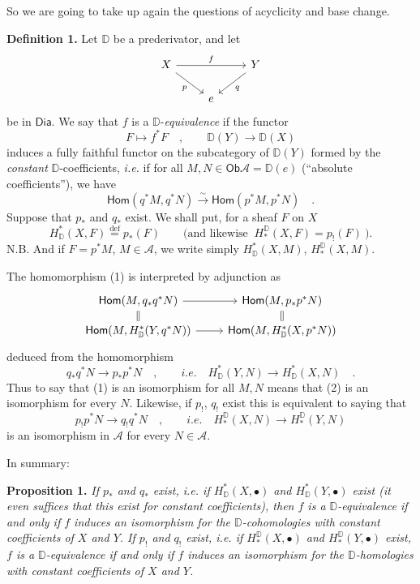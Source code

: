 \documentclass[11pt,leqno]{article}
\newcommand{\printedpage}[1]{\marginpar{\footnotesize p.~#1}}
\newcommand{\msp}[1]{\marginpar{\footnotesize [#1]}}
\newcommand{\DD}{\mathbb{D}}
\newcommand{\cA}{\mathcal{A}}
\newcommand{\Dia}{\mathsf{Dia}}
\newcommand{\Ob}{\mathsf{Ob}}
\newcommand{\isolongto}{\overset{\sim}{\longrightarrow}}
\newcommand{\sHom}{\mathsf{Hom}}
\begin{document}
So we are going to take up again the questions of acyclicity and base change.

\noindent\textbf{Definition 1.} Let $\DD$ be a prederivator, and let
\[
\begin{tikzcd}
X \arrow[rr, "f"] \arrow[dr, "p"'] & & Y \arrow[dl, "q"] \\
& e &
\end{tikzcd}
\]
be in $\Dia$. We say that $f$ is a $\DD$-\textit{equivalence} if the functor
\[
F \longmapsto f^*F \quad , \qquad \DD(Y) \longrightarrow \DD(X)
\]
induces a fully faithful functor on the subcategory of $\DD(Y)$ formed by the \textit{constant} $\DD$-coefficients, \textit{i.e.} if for all $M, N \in \Ob \cA = \DD(e)$ (``absolute coefficients''), we have
\[
\sHom(q^*M, q^*N) \isolongto \sHom(p^*M, p^*N) \quad . \tag*{(1)}
\]
Suppose that $p_*$ and $q_*$ exist. We shall put, for a sheaf $F$ on $X$
\[
H^*_{\DD}(X, F) \overset{\text{def}}{=} p_*(F) \qquad \text{(and likewise } \ H^{\DD}_*(X, F) = p_!(F) \ \text{).}
\]
N.B. And if $F = p^*M$, $M \in \cA$, we write simply $H^*_{\DD}(X, M)$, $H^{\DD}_*(X, M)$.

\noindent The homomorphism (1) is interpreted by adjunction as
\[
\begin{tikzcd}[row sep=small]
\sHom(M, q_*q^*N) \arrow[r] \arrow[d, equal] & \sHom(M, p_*p^*N) \arrow[d, equal] \\
\sHom(M, H^*_{\DD}(Y, q^*N)) \arrow[r] & \sHom(M, H^*_{\DD}(X, p^*N))
\end{tikzcd}
\]
deduced from the homomorphism
\[
q_*q^*N \longrightarrow p_*p^*N \quad , \qquad \textit{i.e.} \quad H^*_{\DD}(Y, N) \longrightarrow H^*_{\DD}(X, N) \quad . \tag*{(2)}
\]
Thus to say that (1) is an isomorphism for all $M, N$ means that (2) is an isomorphism for every $N$. Likewise, if $p_!$, $q_!$ exist this is equivalent to saying that
\[
p_!p^*N \longrightarrow q_!q^*N \quad , \qquad \textit{i.e.} \quad H^{\DD}_*(X, N) \longrightarrow H^{\DD}_*(Y, N) \tag*{$(2')$}
\]
is an isomorphism in $\cA$ for every $N \in \cA$.

\clearpage
\printedpage{36}
\noindent\msp{page 62}

\noindent In summary:

\noindent\textbf{Proposition 1.} \textit{If $p_*$ and $q_*$ exist, i.e. if $H^*_{\DD}(X, \bullet)$ and $H^*_{\DD}(Y, \bullet)$ exist (it even suffices that this exist for constant coefficients), then $f$ is a $\DD$-equivalence if and only if $f$ induces an isomorphism for the $\DD$-cohomologies with constant coefficients of $X$ and $Y$. If $p_!$ and $q_!$ exist, i.e. if $H^{\DD}_*(X, \bullet)$ and $H^{\DD}_*(Y, \bullet)$ exist, $f$ is a $\DD$-equivalence if and only if $f$ induces an isomorphism for the $\DD$-homologies with constant coefficients of $X$ and $Y$.}
\end{document}
